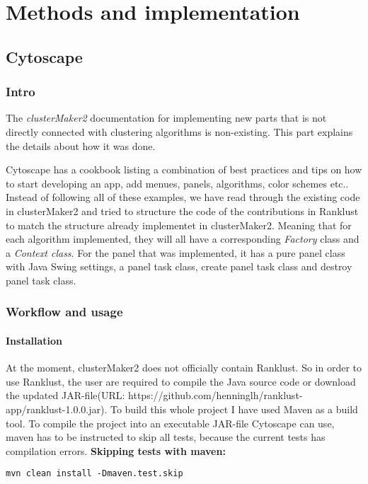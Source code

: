 \part{Methods and implementation}
\label{pa:methods}
\chapter{Cytoscape}
\section{Intro}
The \textit{clusterMaker2} documentation for implementing new parts that is not
directly connected with clustering algorithms is non-existing. This part
explains the details about how it was done.

Cytoscape has a cookbook\cite{cytoscape-cookbook} listing a combination of best
practices and tips on how to start developing an app, add menues, panels,
algorithms, color schemes etc.. Instead of following all of these examples, we
have read through the existing code in clusterMaker2\cite{cm2-github} and tried
to structure the code of the contributions in Ranklust to match the structure
already implementet in clusterMaker2. Meaning that for each algorithm
implemented, they will all have a corresponding \textit{Factory} class and a
\textit{Context class}. For the panel that was implemented, it has a pure panel
class with Java Swing\cite{java-swing} settings, a panel task class, create
panel task class and destroy panel task class.

\section{Workflow and usage}
\subsection{Installation}
At the moment, clusterMaker2 does not officially contain Ranklust. So in order
to use Ranklust, the user are required to compile the Java source code or
download the updated JAR-file\cite{jar}(URL:
https://github.com/henninglh/ranklust-app/ranklust-1.0.0.jar). To build this
whole project I have used Maven as a build tool\cite{maven}. To compile the
project into an executable JAR-file Cytoscape can use, \gls{maven} has to be
instructed to skip all tests, because the current tests has compilation errors.
\textbf{Skipping tests with maven:}
\begin{verbatim}
mvn clean install -Dmaven.test.skip
\end{verbatim}

